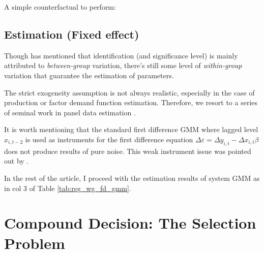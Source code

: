 \documentclass[12pt]{article}
\begin{document}
\begin{table}
    
\end{table}

\begin{table}
    
\end{table}

A simple counterfactual to perform:

\subsection{Estimation (Fixed effect)}
Though \cite{croiset2024hospitals} has mentioned that identification (and
significance level) is mainly attributed to \textit{between-group} variation,
there's still some level of \textit{within-group} variation that guarantee the
estimation of parameters.

The strict exogeneity assumption is not always realistic, especially in the
case of production or factor demand function estimation. Therefore, we resort
to a series of seminal work in panel data estimation
\cite{anderson1982formulation,arellano1991some,arellano1995another,blundell1998initial}.

\begin{table}
    \label{tab:reg_wg_fd_gmm}
    
\end{table}

It is worth mentioning that the standard first difference GMM where lagged
level $x_{i,t-2}$ is used as instruments for the first difference equation
$\Delta \varepsilon = \Delta y_{i,t}-\Delta x_{i,t} \beta$ does not produce
results of pure noise. This weak instrument issue was pointed out by
\cite{blundell1998initial}.

In the rest of the article, I proceed with the estimation results of system GMM
as in col 3 of Table \ref{tab:reg_wg_fd_gmm}.

\section{Compound Decision: The Selection Problem}
\end{document}
